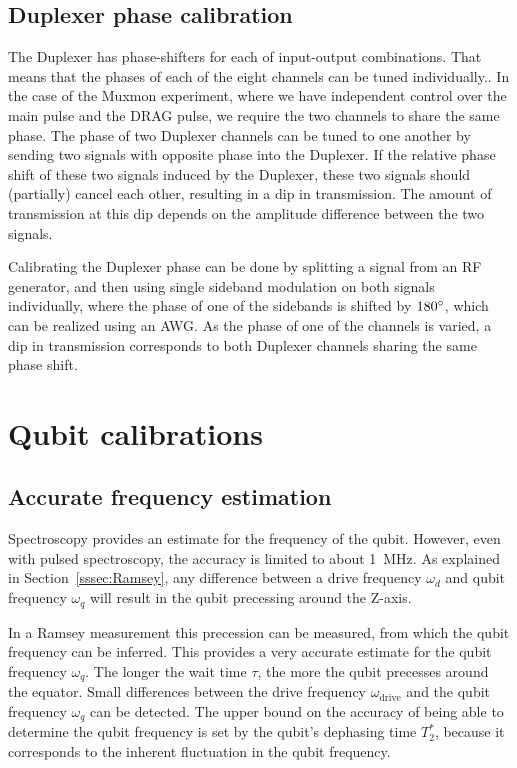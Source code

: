       \subsection{Duplexer phase calibration}
        \label{ssec:Duplexer phase calibration}
        The Duplexer has phase-shifters for each of input-output combinations. That means that the phases of each of the eight channels can be tuned individually.. In the case of the Muxmon experiment, where we have independent control over the main pulse and the DRAG pulse, we require the two channels to share the same phase. The phase of two Duplexer channels can be tuned to one another by sending two signals with opposite phase into the Duplexer. If the relative phase shift of these two signals induced by the Duplexer, these two signals should (partially) cancel each other, resulting in a dip in transmission. The amount of transmission at this dip depends on the amplitude difference between the two signals.

        Calibrating the Duplexer phase can be done by splitting a signal from an RF generator, and then using single sideband modulation on both signals individually, where the phase of one of the sidebands is shifted by $180 \degree$, which can be realized using an AWG. As the phase of one of the channels is varied, a dip in transmission corresponds to both Duplexer channels sharing the same phase shift.

    \section{Qubit calibrations}
      \label{Qubit calibrations}

      \subsection{Accurate frequency estimation}
        \label{ssec:Accurate frequency estimation}
        Spectroscopy provides an estimate for the frequency of the qubit. However, even with pulsed spectroscopy, the accuracy is limited to about \SI{1}{\mega \hertz}. As explained in Section~\ref{sssec:Ramsey}, any difference between a drive frequency $\omega_d$ and qubit frequency $\omega_q$ will result in the qubit precessing around the Z-axis.

        In a Ramsey measurement this precession can be measured, from which the qubit frequency can be inferred. This provides a very accurate estimate for the qubit frequency $\omega_q$. The longer the wait time $\tau$, the more the qubit precesses around the equator. Small differences between the drive frequency $\omega_\text{drive}$ and the qubit frequency $\omega_q$ can be detected. The upper bound on the accuracy of being able to determine the qubit frequency is set by the qubit's dephasing time $T_2^*$, because it corresponds to the inherent fluctuation in the qubit frequency.

